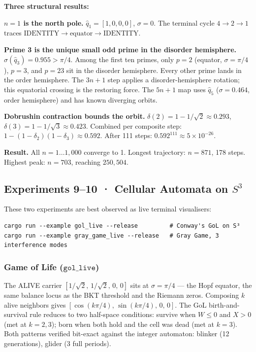 \documentclass[12pt,a4paper]{article}
\theoremstyle{definition}
\theoremstyle{remark}
\begin{document}
\textbf{Three structural results:}

\medskip
\noindent\textbf{$n=1$ is the north pole.}
$\hat{q}_1 = [1,0,0,0]$, $\sigma = 0$. The terminal cycle $4 \to 2 \to 1$
traces $\mathrm{IDENTITY} \to \text{equator} \to \mathrm{IDENTITY}$.

\medskip
\noindent\textbf{Prime 3 is the unique small odd prime in the disorder hemisphere.}
$\sigma(\hat{q}_3) = 0.955 > \pi/4$. Among the first ten primes, only $p=2$
(equator, $\sigma = \pi/4$), $p=3$, and $p=23$ sit in the disorder hemisphere.
Every other prime lands in the order hemisphere. The $3n+1$ step applies a
disorder-hemisphere rotation; this equatorial crossing is the restoring force.
The $5n+1$ map uses $\hat{q}_5$ ($\sigma = 0.464$, order hemisphere) and has
known diverging orbits.

\medskip
\noindent\textbf{Dobrushin contraction bounds the orbit.}
$\delta(2) = 1 - 1/\!\sqrt{2} \approx 0.293$,
$\delta(3) = 1 - 1/\!\sqrt{3} \approx 0.423$.
Combined per composite step: $1-(1-\delta_2)(1-\delta_3) \approx 0.592$.
After 111 steps: $0.592^{111} \approx 5 \times 10^{-26}$.

\textbf{Result.} All $n = 1 \ldots 1{,}000$ converge to 1.
Longest trajectory: $n = 871$, 178 steps.
Highest peak: $n = 703$, reaching $250{,}504$.

\subsection{Experiments 9--10 · Cellular Automata on $S^3$}
\label{app:exp9}

These two experiments are best observed as live terminal visualisers:

\begin{verbatim}
cargo run --example gol_live --release         # Conway's GoL on S³
cargo run --example gray_game_live --release   # Gray Game, 3 interference modes
\end{verbatim}

\subsubsection*{Game of Life ($\mathtt{gol\_live}$)}

The ALIVE carrier $[1/\!\sqrt{2},\,1/\!\sqrt{2},\,0,\,0]$ sits at
$\sigma = \pi/4$ — the Hopf equator, the same balance locus as the
BKT threshold and the Riemann zeros.
Composing $k$ alive neighbors gives $[\cos(k\pi/4),\,\sin(k\pi/4),\,0,\,0]$.
The GoL birth-and-survival rule reduces to two half-space conditions:
survive when $W \leq 0$ and $X > 0$ (met at $k=2,3$); born when both hold
and the cell was dead (met at $k=3$).
Both patterns verified bit-exact against the integer automaton: blinker
(12 generations), glider (3 full periods).
\end{document}
